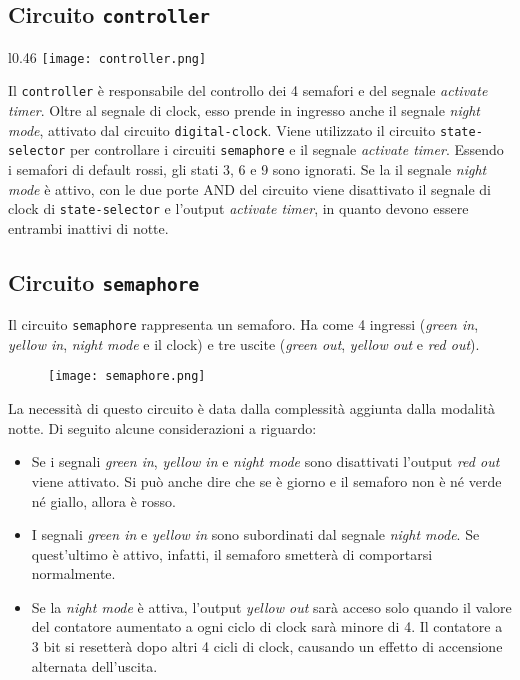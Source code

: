 \documentclass{article}
\def\code#1{\texttt{#1}}
\begin{document}
\subsection{Circuito \code{controller}}

\begin{wrapfigure}[15]{l}{0.46\textwidth}
    \texttt{[image: controller.png]}
\end{wrapfigure}

Il \code{controller} è responsabile del controllo dei 4 semafori e del segnale \textit{activate timer}. Oltre al segnale di clock, esso prende in ingresso anche il segnale \textit{night mode}, attivato dal circuito \code{digital-clock}.
Viene utilizzato il circuito \code{state-selector} per controllare i circuiti \code{semaphore} e il segnale \textit{activate timer}. Essendo i semafori di default rossi, gli stati 3, 6 e 9 sono ignorati.
Se la il segnale \textit{night mode} è attivo, con le due porte AND del circuito viene disattivato il segnale di clock di \code{state-selector} e l'output \textit{activate timer}, in quanto devono essere entrambi inattivi di notte.

\clearpage

\subsection{Circuito \code{semaphore}}
Il circuito \code{semaphore} rappresenta un semaforo. Ha come 4 ingressi (\textit{green in}, \textit{yellow in}, \textit{night mode} e il clock) e tre uscite (\textit{green out}, \textit{yellow out} e \textit{red out}).

\begin{figure}[htp]
    \texttt{[image: semaphore.png]}
    \captionsetup{belowskip=0pt}
\end{figure}

La necessità di questo circuito è data dalla complessità aggiunta dalla modalità notte. Di seguito alcune considerazioni a riguardo:
\begin{itemize}
    \item Se i segnali \textit{green in}, \textit{yellow in} e \textit{night mode} sono disattivati l'output \textit{red out} viene attivato. Si può anche dire che se è giorno e il semaforo non è né verde né giallo, allora è rosso.
    \item I segnali \textit{green in} e \textit{yellow in} sono subordinati dal segnale \textit{night mode}. Se quest'ultimo è attivo, infatti, il semaforo smetterà di comportarsi normalmente.
    \item Se la \textit{night mode} è attiva, l'output \textit{yellow out} sarà acceso solo quando il valore del contatore aumentato a ogni ciclo di clock sarà minore di 4. Il contatore a 3 bit si resetterà dopo altri 4 cicli di clock, causando un effetto di accensione alternata dell'uscita.
\end{itemize}
\clearpage
\end{document}
